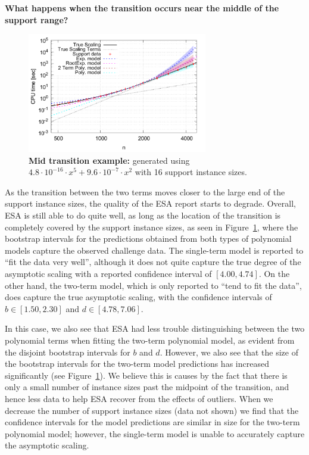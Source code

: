 \documentclass[aic]{iosart2x}
\begin{document}
\textbf{What happens when the transition occurs near the middle of the support range?}
\begin{figure}[t]
\centering
\includegraphics[width=0.7\textwidth]{fittedModels-2-5-15-16s.pdf}
\caption{\textbf{Mid transition example:} generated using $4.8\cdot 10^{-16} \cdot x^5 + 9.6\cdot 10^{-7} \cdot x^2$ with 16 support instance sizes.}
\label{fig:AA-competing-2-5-15-16s}
\end{figure}
As the transition between the two terms moves closer to the large end of the support instance sizes, the quality of the ESA report starts to degrade. Overall, ESA is still able to do quite well, as long as the location of the transition is completely covered by the support instance sizes, as seen in Figure~\ref{fig:AA-competing-2-5-15-16s}, where the bootstrap intervals for the predictions obtained from both types of polynomial models capture the observed challenge data. 
The single-term model is reported to ``fit the data very well'', although it does not quite capture the true degree of the asymptotic scaling with a reported confidence interval of $[4.00,4.74]$. 
On the other hand, the two-term model, which is only reported to ``tend to fit the data'', does capture the true asymptotic scaling, with the confidence intervals of $b \in [1.50,2.30]$ and $d \in [4.78,7.06]$. 

In this case, we also see that ESA had less trouble distinguishing between the two polynomial terms when fitting the two-term polynomial model, as evident from the disjoint bootstrap intervals for $b$ and $d$.
However, we also see that the size of the bootstrap intervals for the two-term model predictions has increased significantly (see Figure~\ref{fig:AA-competing-2-5-15-16s}). 
We believe this is causes by the fact that there is only a small number of instance sizes past the midpoint of the transition, and hence less data to help ESA recover from the effects of outliers. 
When we decrease the number of support instance sizes (data not shown) we find that the confidence intervals for the model predictions are similar in size for the two-term polynomial model; however, the single-term model is unable to accurately capture the asymptotic scaling.
\end{document}
